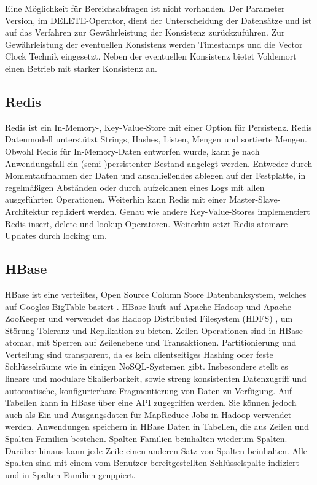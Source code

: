 Eine Möglichkeit für Bereichsabfragen ist nicht vorhanden. Der Parameter Version, im DELETE-Operator, dient der Unterscheidung der Datensätze und ist auf das Verfahren zur Gewährleistung der Konsistenz zurückzuführen. Zur Gewährleistung der eventuellen Konsistenz werden Timestamps und die Vector Clock Technik eingesetzt. Neben der eventuellen Konsistenz bietet Voldemort einen Betrieb mit starker Konsistenz an.       

\subsection{Redis}
\label{ch:AnalyseDatenbanken:sec:Datenbanken:subsec:Redis}

Redis \cite{red2013} ist ein In-Memory-, Key-Value-Store mit einer Option für Persistenz. Redis Datenmodell unterstützt Strings, Hashes, Listen, Mengen und sortierte Mengen. Obwohl Redis für In-Memory-Daten entworfen wurde, kann je nach Anwendungsfall ein (semi-)persistenter Bestand angelegt werden. Entweder durch Momentaufnahmen der Daten und anschließendes ablegen auf der Festplatte, in regelmäßigen Abständen oder durch aufzeichnen eines Logs mit allen ausgeführten Operationen. Weiterhin kann Redis mit einer Master-Slave-Architektur repliziert werden. Genau wie andere Key-Value-Stores implementiert Redis insert, delete und lookup Operatoren. Weiterhin setzt Redis atomare Updates durch locking um. 

\subsection{HBase} 
\label{ch:AnalyseDatenbanken:sec:Datenbanken:subsec:HBase}

HBase ist eine verteiltes, Open Source Column Store Datenbanksystem, welches auf Googles BigTable basiert \cite{Chang:2006:BDS:1267308.1267323}. HBase läuft auf Apache Hadoop und Apache ZooKeeper  \cite{Hunt:2010:ZWC:1855840.1855851} und verwendet das Hadoop Distributed Filesystem (HDFS) \cite{Shvachko:2010:HDF:1913798.1914427}, um Störung-Toleranz und Replikation zu bieten. Zeilen Operationen sind in HBase atomar, mit Sperren auf Zeilenebene und Transaktionen. Partitionierung und Verteilung sind transparent, da es kein clientseitiges Hashing oder feste Schlüsselräume wie in einigen NoSQL-Systemen gibt. 
Insbesondere stellt es lineare und modulare Skalierbarkeit, sowie streng konsistenten Datenzugriff und automatische, konfigurierbare Fragmentierung von Daten zu Verfügung. Auf Tabellen kann in HBase über eine API zugegriffen werden. Sie können jedoch auch als Ein-und Ausgangsdaten für MapReduce-Jobs in Hadoop verwendet werden. Anwendungen speichern in HBase Daten in Tabellen, die aus Zeilen und Spalten-Familien bestehen. Spalten-Familien beinhalten wiederum Spalten. Darüber hinaus kann jede Zeile einen anderen Satz von Spalten beinhalten. Alle Spalten sind mit einem vom Benutzer bereitgestellten Schlüsselspalte indiziert und in Spalten-Familien gruppiert.

